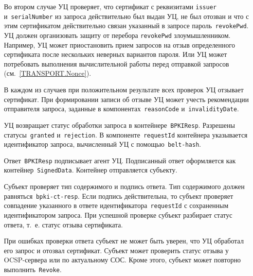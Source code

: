 Во втором случае УЦ проверяет, что сертификат с реквизитами 
\texttt{issuer} и~\texttt{serialNumber} из запроса действительно
был выдан УЦ, не был отозван и что с этим сертификатом действительно 
связан указанный в запросе пароль~\texttt{revokePwd}.
%
УЦ должен организовать защиту от перебора \texttt{revokePwd} злоумышленником. 
Например, УЦ может приостановить прием запросов на отзыв определенного 
сертификата после нескольких неверных вариантов пароля.
Или УЦ может потребовать выполнения вычислительной работы перед отправкой 
запросов (см.~\ref{TRANSPORT.Nonce}).

В каждом из случаев при положительном результате всех проверок
УЦ отзывает сертификат. При формировании записи об отзыве 
УЦ может учесть рекомендации отправителя запроса, заданные 
в компонентах~\texttt{reasonCode} и~\texttt{invalidityDate}.

УЦ возвращает статус обработки запроса в контейнере~\texttt{BPKIResp}.
Разрешены статусы~\texttt{granted} и~\texttt{rejection}.
В компоненте~\texttt{requestId} контейнера указывается идентификатор 
запроса, вычисленный УЦ с помощью~\texttt{belt-hash}.

Ответ~\texttt{BPKIResp} подписывает агент УЦ. 
Подписанный ответ оформляется как контейнер~\texttt{SignedData}. 
Контейнер отправляется субъекту.

Субъект проверяет тип содержимого и подпись ответа. 
Тип содержимого должен равняться~\texttt{bpki-ct-resp}.
Если подпись действительна, то субъект проверяет совпадение указанного в 
ответе идентификатора~\texttt{requestId} с сохраненным идентификатором запроса. 
При успешной проверке субъект разбирает статус ответа, т.~е. статус отзыва 
сертификата. 

При ошибках проверки ответа субъект не может быть уверен, что УЦ обработал
его запрос и отозвал сертификат. Субъект может проверить статус отзыва
у OCSP-сервера или по актуальному СОС. Кроме этого, субъект может 
повторно выполнить~\texttt{Revoke}. 

